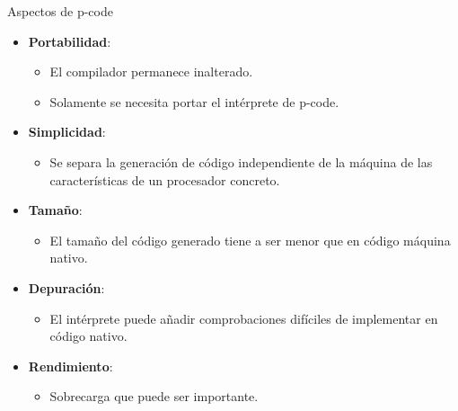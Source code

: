 \begin{frame}[t]{Aspectos de p-code}
  \begin{itemize}
    \item \pause \textbf{\color{blue}Portabilidad}:
      \begin{itemize}
        \item El compilador permanece inalterado.
        \item Solamente se necesita portar el intérprete de p-code.
      \end{itemize}
    \item \pause \textbf{\color{blue}Simplicidad}:
      \begin{itemize}
        \item Se separa la generación de código independiente de la máquina de las características de un procesador concreto.
      \end{itemize}
    \item \pause \textbf{\color{blue}Tamaño}:
      \begin{itemize}
        \item El tamaño del código generado tiene a ser menor que en código máquina nativo.
      \end{itemize}
    \item \pause \textbf{\color{blue}Depuración}:
      \begin{itemize}
        \item El intérprete puede añadir comprobaciones difíciles de implementar en código nativo.
      \end{itemize}
    \item \pause \textbf{\color{blue}Rendimiento}:
      \begin{itemize}
        \item Sobrecarga que puede ser importante.
      \end{itemize}
  \end{itemize}
\end{frame}

